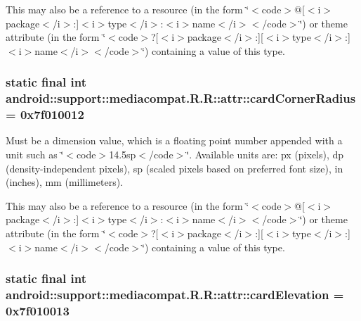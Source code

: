 This may also be a reference to a resource (in the form \char`\"{}$<$code$>$@\mbox{[}$<$i$>$package$<$/i$>$:\mbox{]}$<$i$>$type$<$/i$>$:$<$i$>$name$<$/i$>$$<$/code$>$\char`\"{}) or theme attribute (in the form \char`\"{}$<$code$>$?\mbox{[}$<$i$>$package$<$/i$>$:\mbox{]}\mbox{[}$<$i$>$type$<$/i$>$:\mbox{]}$<$i$>$name$<$/i$>$$<$/code$>$\char`\"{}) containing a value of this type. \hypertarget{classandroid_1_1support_1_1mediacompat_1_1_r_1_1attr_e3f24f894b66ee352b2a70db784cf32b}{
\subsubsection[{cardCornerRadius}]{\setlength{\rightskip}{0pt plus 5cm}static final int android::support::mediacompat.R.R::attr::cardCornerRadius = 0x7f010012}}
\label{classandroid_1_1support_1_1mediacompat_1_1_r_1_1attr_e3f24f894b66ee352b2a70db784cf32b}


Must be a dimension value, which is a floating point number appended with a unit such as \char`\"{}$<$code$>$14.5sp$<$/code$>$\char`\"{}. Available units are: px (pixels), dp (density-independent pixels), sp (scaled pixels based on preferred font size), in (inches), mm (millimeters). 

This may also be a reference to a resource (in the form \char`\"{}$<$code$>$@\mbox{[}$<$i$>$package$<$/i$>$:\mbox{]}$<$i$>$type$<$/i$>$:$<$i$>$name$<$/i$>$$<$/code$>$\char`\"{}) or theme attribute (in the form \char`\"{}$<$code$>$?\mbox{[}$<$i$>$package$<$/i$>$:\mbox{]}\mbox{[}$<$i$>$type$<$/i$>$:\mbox{]}$<$i$>$name$<$/i$>$$<$/code$>$\char`\"{}) containing a value of this type. \hypertarget{classandroid_1_1support_1_1mediacompat_1_1_r_1_1attr_939cc4f7663fc72f9260f16f1a09bde7}{
\subsubsection[{cardElevation}]{\setlength{\rightskip}{0pt plus 5cm}static final int android::support::mediacompat.R.R::attr::cardElevation = 0x7f010013}}
\label{classandroid_1_1support_1_1mediacompat_1_1_r_1_1attr_939cc4f7663fc72f9260f16f1a09bde7}


